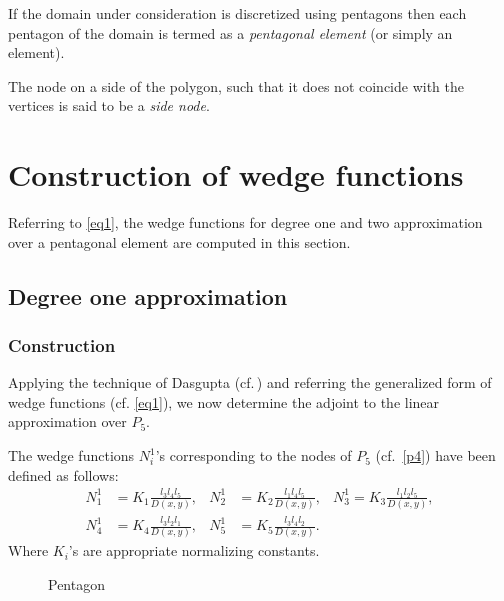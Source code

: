 \documentclass[automatic-bibliography, defaultmaths=false]{univsciauth}
\begin{document}
\begin{definition}
  If the domain under consideration is discretized using pentagons then each
  pentagon of the domain is termed as a \emph{pentagonal element} (or simply an
  element).
\end{definition}

\begin{definition}
  The node on a side of the polygon, such that it does not coincide with
  the vertices is said to be a \emph{side node}.
\end{definition}

\section{Construction of wedge functions}\label{sec3}
Referring to \autoref{eq1}, the wedge functions for degree one and two
approximation over a pentagonal element are  computed in this section.

\subsection{Degree one approximation}

\subsubsection{Construction}

Applying the technique of Dasgupta (cf.\,\cite{das}) and referring the
generalized form of wedge functions (cf. \autoref{eq1}), we now determine the
adjoint to the linear approximation over $P_5$.

The wedge functions $N_i^1$\rq{}s corresponding to the nodes of $P_5$
(cf.~\autoref{p4}) have been defined as follows:
\begin{equation}
  \begin{aligned}\label{d2}
    N_1^1&=K_1\frac{l_{3}l_{4}l_{5}}{D(x,y)},
    &N_2^1&=K_2\frac{l_{1}l_{4}l_{5}}{D(x,y)},
    &N_3^1=K_3\frac{l_{1}l_{2}l_{5}}{D(x,y)},\\
    N_4^1&=K_4\frac{l_{3}l_{2}l_{1}}{D(x,y)},
    &N_5^1&=K_5\frac{l_{3}l_{4}l_{2}}{D(x,y)}.
  \end{aligned}
\end{equation}
Where $K_i$'s are appropriate normalizing constants.
\begin{figure}[t!]
  \centering
  \caption{Pentagon}\label{p4}
\end{figure}
\end{document}
